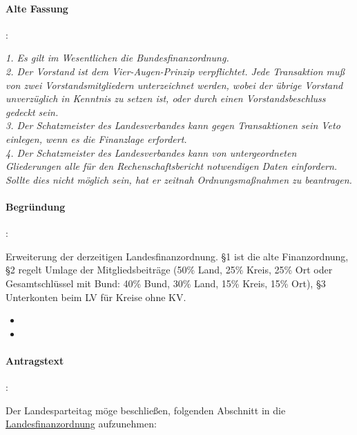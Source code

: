 \paragraph{Alte Fassung}:

\textit{1. Es gilt im Wesentlichen die Bundesfinanzordnung.\\
2. Der Vorstand ist dem Vier-Augen-Prinzip verpflichtet. Jede Transaktion muß von zwei Vorstandsmitgliedern unterzeichnet werden, wobei der übrige Vorstand unverzüglich in Kenntnis zu setzen ist, oder durch einen Vorstandsbeschluss gedeckt sein.\\
3. Der Schatzmeister des Landesverbandes kann gegen Transaktionen sein Veto einlegen, wenn es die Finanzlage erfordert.\\
4. Der Schatzmeister des Landesverbandes kann von untergeordneten Gliederungen alle für den Rechenschaftsbericht notwendigen Daten einfordern. Sollte dies nicht möglich sein, hat er zeitnah Ordnungsmaßnahmen zu beantragen.}

\paragraph{Begründung}:

Erweiterung der derzeitigen Landesfinanzordnung. §1 ist die alte Finanzordnung, §2 regelt Umlage der Mitgliedsbeiträge (50\% Land, 25\% Kreis, 25\% Ort oder Gesamtschlüssel mit Bund: 40\% Bund, 30\% Land, 15\% Kreis, 15\% Ort), §3 Unterkonten beim LV für Kreise ohne KV.


\label{satzung:partfin1}
\begin{itemize}
\item {}
\item {}
\end{itemize}

\paragraph{Antragstext}:

Der Landesparteitag möge beschließen, folgenden Abschnitt in die \href{http://wiki.piratenpartei.de/LSA:Satzung#Abschnitt_B:_Finanzordnung}{Landesfinanzordnung} aufzunehmen: 

